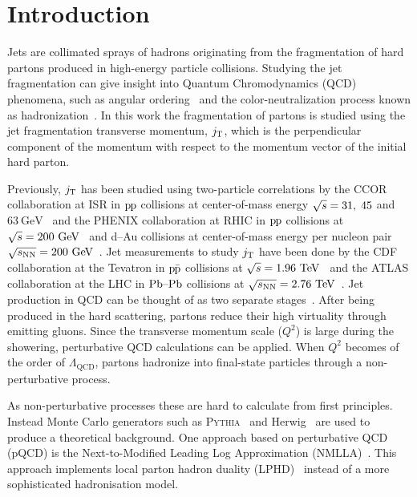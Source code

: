 \linenumbers

\section{Introduction}
\label{sec:introduction}
Jets are collimated sprays of hadrons originating from the fragmentation of hard partons produced in high-energy particle collisions. Studying the jet fragmentation can give insight into Quantum Chromodynamics (QCD)~\cite{gross1973ultraviolet, politzer1973reliable, gross1973asymptotically, gross1974asymptotically, georgi1974electroproduction} phenomena, such as angular ordering~\cite{basicsofpqcd} and the color-neutralization process known as hadronization~\cite{introPythia81,herwigManual,herwig7releaseNote}. In this work the fragmentation of partons is studied using the jet fragmentation transverse momentum, $\jt{}$, which is the perpendicular component of the momentum with respect to the momentum vector of the initial hard parton.

Previously, $\jt{}$ has been studied using two-particle correlations by the CCOR collaboration at ISR in $\pp$ collisions at center-of-mass energy $\sqrtS = 31,\;45$ and $63~\mathrm{GeV}$~\cite{firstjtmeasurement} and the PHENIX collaboration at RHIC in $\pp$ collisions at $\sqrtSE[GeV]{200}$~\cite{PHENIXjets} and d--Au collisions at center-of-mass energy per nucleon pair $\sqrtSnnE[GeV]{200}$~\cite{phenixJtPAu}.
Jet measurements to study $\jt{}$ have been done by the CDF collaboration at the Tevatron in $\ppbar$ collisions at $\sqrtSE{1.96}$~\cite{cdfpaper} and the ATLAS collaboration at the LHC in $\PbPb$ collisions at $\sqrtSnnE{2.76}$~\cite{atlaksenJetit}.
Jet production in QCD can be thought of as two separate stages~\cite{eventGenerators}. After being produced in the hard scattering, partons reduce their high virtuality through emitting gluons. Since the transverse momentum scale ($Q^{2}$) is large during the showering, perturbative QCD calculations can be applied. When $Q^{2}$ becomes of the order of $\Lambda_{\mathrm{QCD}}$, partons hadronize into final-state particles through a non-perturbative process.

As non-perturbative processes these are hard to calculate from first principles. Instead Monte Carlo generators such as \textsc{Pythia}~\cite{introPythia81} and Herwig~\cite{herwig7releaseNote} are used to produce a theoretical background. One approach based on perturbative QCD (pQCD) is the Next-to-Modified Leading Log Approximation (NMLLA)~\cite{nmlla}. This approach implements local parton hadron duality (LPHD)~\cite{Azimov:1984np} instead of a more sophisticated hadronisation model.

